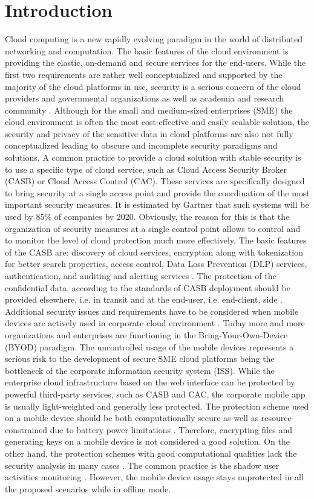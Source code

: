 \documentclass[twocolumn]{svjour3}          %
\begin{document}
\section{Introduction}
\label{sec_intro}
Cloud computing is a new rapidly evolving paradigm in the world of distributed networking and computation. The basic features of the cloud environment is providing the elastic, on-demand and secure services for the end-users. While the first two requirements are rather well conceptualized and supported by the majority of the cloud platforms in use, security is a serious concern of the cloud providers and governmental organizations as well as academia and research community \cite{csa2016,higashi2015,gartner2015}. Although for the small and medium-sized enterprises (SME) the cloud environment is often the most cost-effective and easily scalable solution, the security and privacy of the sensitive data in cloud platforms are also not fully conceptualized leading to obscure and incomplete security paradigms and solutions.
A common practice to provide a cloud solution with stable security is to use a specific type of cloud service, such as Cloud Access Security Broker (CASB) or Cloud Access Control (CAC). These services are specifically designed to bring security at a single access point and provide the coordination of the most important security measures. It is estimated by Gartner \cite{skyhigh2015} that such systems will be used by 85\%  of companies by 2020. Obviously, the reason for this is that the organization of security measures at a single control point allows to control and to monitor the level of cloud protection much more effectively. The basic features of the CASB are: discovery of cloud services, encryption along with tokenization for better search properties, access control, Data Loss Prevention (DLP) services, authentication, and auditing and alerting services \cite{lawson2015}. The protection of the confidential data, according to the standards of CASB deployment should be provided elsewhere, i.e. in transit and at the end-user, i.e. end-client, side \cite{campbell2015}.
Additional security issues and requirements have to be considered when mobile devices are actively used in corporate cloud environment \cite{yovel2014}. Today more and more organizations and enterprises are functioning in the Bring-Your-Own-Device (BYOD) paradigm. The uncontrolled usage of the mobile devices represents a serious risk to the development of secure SME cloud platforms being the bottleneck of the corporate information security system (ISS). While the enterprise cloud infrastructure based on the web interface can be protected by powerful third-party services, such as CASB and CAC, the corporate mobile app is usually light-weighted and generally less protected. The protection scheme used on a mobile device should be both computationally secure as well as resource-constrained due to battery power limitations \cite{khan2015cloud}. Therefore, encrypting files and generating keys on a mobile device is not considered a good solution. On the other hand, the protection schemes with good computational qualities lack the security analysis in many cases \cite{khan2014bss}. The common practice is the shadow user activities monitoring \cite{yovel2014}. However, the mobile device usage stays unprotected in all the proposed scenarios while in offline mode.
\end{document}
